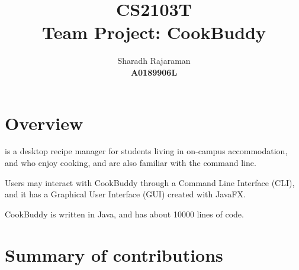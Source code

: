 \documentclass[11pt,british]{article}
\title{\textbf{CS2103T} \\ Team Project: CookBuddy}
\author{Sharadh Rajaraman \\ \textbf{A0189906L}}
\begin{document}
\maketitle

\section{Overview}\label{overview}

\href{}{} is a desktop recipe manager for students living in
on-campus accommodation, and who enjoy cooking, and are also familiar
with the command line.

Users may interact with CookBuddy through a Command Line Interface
(CLI), and it has a Graphical User Interface (GUI) created with JavaFX.

CookBuddy is written in Java, and has about \num{10000} lines of code.

\section{Summary of contributions}\label{summaryofcontributions}
\end{document}
